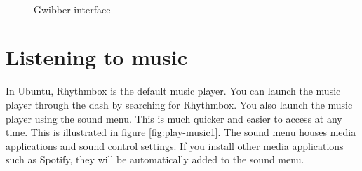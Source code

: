 \begin{figure}[ht!]	
		\centering		
		~ \hspace{0.5in}
		\caption{Gwibber interface}
		\label{fig:gwibber}
\end{figure}


\section{Listening to music} 
In Ubuntu, Rhythmbox is the default music player. You can launch the music player through the dash by searching for Rhythmbox. You also launch the music player using the sound menu. This is much quicker and easier to access at any time. This is illustrated in figure \ref{fig:play-music1}. The sound menu houses media applications and sound control settings. If you install other media applications such as Spotify, they will be automatically added to the sound menu. \\

